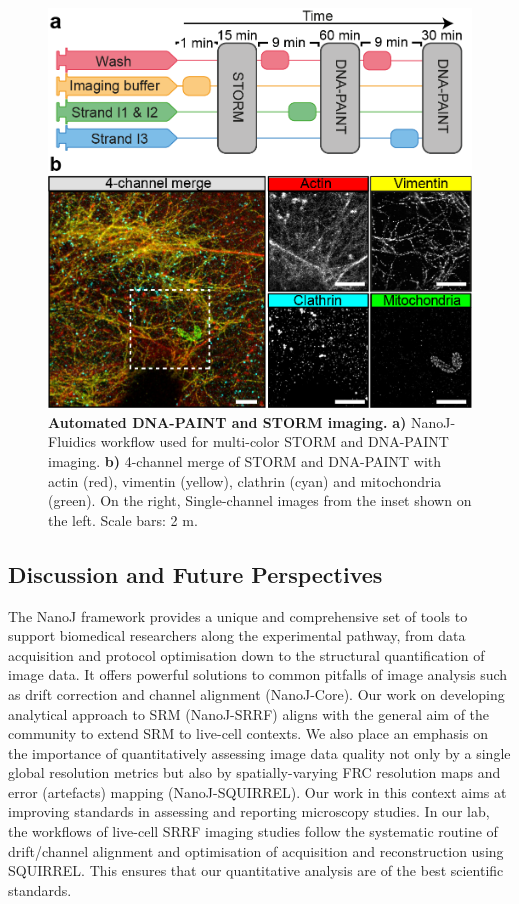 \begin{figure}[!t]
    \centering
    \includegraphics{Figures/FigurePumpy_v3.png}
    \caption{\textbf{Automated DNA-PAINT and STORM imaging.} \textbf{a)} NanoJ-Fluidics workflow used for multi-color STORM and DNA-PAINT imaging. \textbf{b)} 4-channel merge of STORM and DNA-PAINT with actin (red), vimentin (yellow), clathrin (cyan) and mitochondria (green). On the right, Single-channel images from the inset shown on the left. Scale bars: 2 \textmu{}m.}
    \label{fig:PAINT}
\end{figure}

\subsection*{Discussion and Future Perspectives}
 The NanoJ framework provides a unique and comprehensive set of tools to support biomedical researchers along the experimental pathway, from data acquisition and protocol optimisation down to the structural quantification of image data. It offers powerful solutions to common pitfalls of image analysis such as drift correction and channel alignment (NanoJ-Core). Our work on developing analytical approach to SRM (NanoJ-SRRF) aligns with the general aim of the community to extend SRM to live-cell contexts. We also place an emphasis on the importance of quantitatively assessing image data quality not only by a single global resolution metrics but also by spatially-varying FRC resolution maps and error (artefacts) mapping (NanoJ-SQUIRREL). Our work in this context aims at improving standards in assessing and reporting microscopy studies. In our lab, the workflows of live-cell SRRF imaging studies follow the systematic routine of drift/channel alignment and optimisation of acquisition and reconstruction using SQUIRREL. This ensures that our quantitative analysis are of the best scientific standards.
 
